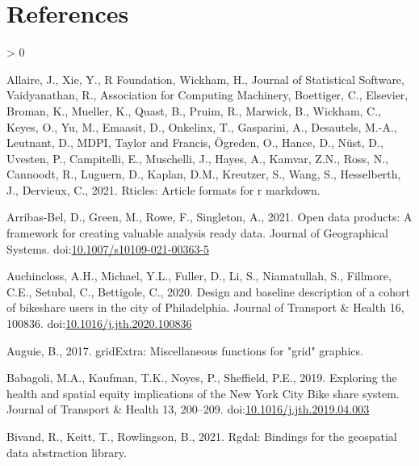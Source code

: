 \documentclass[]{elsarticle} %
\newlength{\cslhangindent}
\newenvironment{CSLReferences}[2] %
 {%
  \setlength{\parindent}{0pt}
  \ifodd #1 \everypar{\setlength{\hangindent}{\cslhangindent}}\ignorespaces\fi
  \ifnum #2 > 0
  \setlength{\parskip}{#2\baselineskip}
  \fi
 }%
 {}
\begin{document}
\hypertarget{references}{%
\section*{References}\label{references}}

\hypertarget{refs}{}
\begin{CSLReferences}{1}{0}
\leavevmode\hypertarget{ref-R-rticles}{}%
Allaire, J., Xie, Y., R Foundation, Wickham, H., Journal of Statistical
Software, Vaidyanathan, R., Association for Computing Machinery,
Boettiger, C., Elsevier, Broman, K., Mueller, K., Quast, B., Pruim, R.,
Marwick, B., Wickham, C., Keyes, O., Yu, M., Emaasit, D., Onkelinx, T.,
Gasparini, A., Desautels, M.-A., Leutnant, D., MDPI, Taylor and Francis,
Ögreden, O., Hance, D., Nüst, D., Uvesten, P., Campitelli, E.,
Muschelli, J., Hayes, A., Kamvar, Z.N., Ross, N., Cannoodt, R., Luguern,
D., Kaplan, D.M., Kreutzer, S., Wang, S., Hesselberth, J., Dervieux, C.,
2021. Rticles: Article formats for r markdown.

\leavevmode\hypertarget{ref-arribas2021open}{}%
Arribas-Bel, D., Green, M., Rowe, F., Singleton, A., 2021. Open data
products: A framework for creating valuable analysis ready data. Journal
of Geographical Systems.
doi:\href{https://doi.org/10.1007/s10109-021-00363-5}{10.1007/s10109-021-00363-5}

\leavevmode\hypertarget{ref-auchinclossDesignBaselineDescription2020}{}%
Auchincloss, A.H., Michael, Y.L., Fuller, D., Li, S., Niamatullah, S.,
Fillmore, C.E., Setubal, C., Bettigole, C., 2020. Design and baseline
description of a cohort of bikeshare users in the city of
{Philadelphia}. Journal of Transport \& Health 16, 100836.
doi:\href{https://doi.org/10.1016/j.jth.2020.100836}{10.1016/j.jth.2020.100836}

\leavevmode\hypertarget{ref-R-gridExtra}{}%
Auguie, B., 2017. gridExtra: Miscellaneous functions for "grid"
graphics.

\leavevmode\hypertarget{ref-babagoliExploringHealthSpatial2019}{}%
Babagoli, M.A., Kaufman, T.K., Noyes, P., Sheffield, P.E., 2019.
Exploring the health and spatial equity implications of the {New York
City Bike} share system. Journal of Transport \& Health 13, 200--209.
doi:\href{https://doi.org/10.1016/j.jth.2019.04.003}{10.1016/j.jth.2019.04.003}

\leavevmode\hypertarget{ref-R-rgdal}{}%
Bivand, R., Keitt, T., Rowlingson, B., 2021. Rgdal: Bindings for the
geospatial data abstraction library.


\end{CSLReferences}
\end{document}
